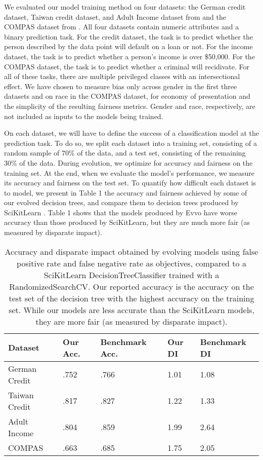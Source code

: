 \documentclass[10pt]{acmart}
\begin{document}
We evaluated our model training method on four datasets: the German credit dataset, Taiwan credit dataset, and Adult Income dataset from \citep{Dua:2019} and the COMPAS dataset from \citep{Larson:2016}. All four datasets contain numeric attributes and a binary prediction task. For the credit dataset, the task is to predict whether the person described by the data point will default on a loan or not. For the income dataset, the task is to predict whether a person's income is over \$50,000. For the COMPAS dataset, the task is to predict whether a criminal will recidivate. For all of these tasks, there are multiple privileged classes with an intersectional effect. We have chosen to measure bias only across gender in the first three datasets and on race in the COMPAS dataset, for economy of presentation and the simplicity of the resulting fairness metrics. Gender and race, respectively, are not included as inputs to the models being trained.

On each dataset, we will have to define the success of a classification model at the prediction task. To do so, we split each dataset into a training set, consisting of a random sample of 70\% of the data, and a test set, consisting of the remaining 30\% of the data. During evolution, we optimize for accuracy and fairness on the training set. At the end, when we evaluate the model’s performance, we measure its accuracy and fairness on the test set. To quantify how difficult each dataset is to model, we present in Table 1 the accuracy and fairness achieved by some of our evolved decision trees, and compare them to decision trees produced by SciKitLearn \citep{scikit-learn}. Table 1 shows that the models produced by Evvo have worse accuracy than those produced by SciKitLearn, but they are much more fair (as measured by disparate impact).

\renewcommand{\arraystretch}{1.5}
\begin{table}
	\begin{center}
	\begin{tabular}{| l | l | l | l | l |}
	\hline Dataset & Our Acc. & Benchmark Acc. & Our DI & Benchmark DI
	\\ \hline German Credit & .752 & .766 & 1.01 & 1.08
	\\ \hline Taiwan Credit & .817 & .827 & 1.22 & 1.33
	\\ \hline Adult Income  & .804 & .859 & 1.99 & 2.64
	\\ \hline COMPAS        & .663 & .685 & 1.75 & 2.05
	\\ \hline
	\end{tabular}
	\end{center}
    \caption{Accuracy and disparate impact obtained by evolving models using false positive rate and false negative rate as objectives, compared to a SciKitLearn DecisionTreeClassifier trained with a RandomizedSearchCV. Our reported accuracy is the accuracy on the test set of the decision tree with the highest accuracy on the training set. While our models are less accurate than the SciKitLearn models, they are more fair (as measured by disparate impact).}
\end{table}
\end{document}
